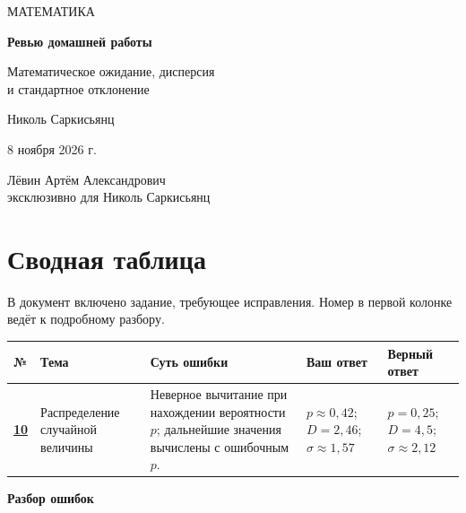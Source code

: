 \documentclass[a4paper,11pt]{article}
\begin{document}
\thispagestyle{empty}
\begin{center}
\vspace*{21mm}
{\large\textcolor{darkaccent}{МАТЕМАТИКА}}\par
\vspace{35mm}
{\fontsize{26}{32}\selectfont\bfseries Ревью домашней работы}\par
\vspace{7mm}
{\Large Математическое ожидание, дисперсия\\ и стандартное отклонение}\par
\vspace{25mm}
{\large Николь Саркисьянц}\par
\vspace{8mm}
{\normalsize 8 ноября 2026 г.}\par
\end{center}
\vfill
\begin{center}
\par
\vspace{9mm}
{\small Лёвин Артём Александрович\\ эксклюзивно для Николь Саркисьянц}
\end{center}
\clearpage
\section*{Сводная таблица}
В документ включено задание, требующее исправления. Номер в первой колонке ведёт к подробному разбору.\par\vspace{5mm}
\small
\renewcommand{\arraystretch}{1.4}
\begin{tabularx}{\linewidth}{@{}p{11mm}p{24mm}Y p{32mm}p{31mm}@{}}
\toprule
\textbf{№} & \textbf{Тема} & \textbf{Суть ошибки} & \textbf{Ваш ответ} & \textbf{Верный ответ}\\
\midrule
\hyperref[task:10]{\textbf{10}} & Распределение случайной величины & Неверное вычитание при нахождении вероятности $p$; дальнейшие значения вычислены с ошибочным $p$. & $p\approx 0{,}42$; $D=2{,}46$; $\sigma\approx1{,}57$ & $p=0{,}25$; $D=4{,}5$; $\sigma\approx2{,}12$\\
\bottomrule
\end{tabularx}
\normalsize
\clearpage
\thispagestyle{empty}
\vspace*{0.36\textheight}
\begin{center}
{\fontsize{27}{33}\selectfont\bfseries\textcolor{darkaccent}{Разбор ошибок}}
\end{center}
\clearpage
{}\label{task:10}
\end{document}
